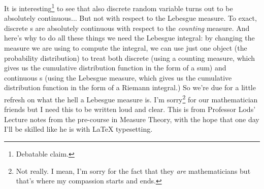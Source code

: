 \documentclass{report}
\begin{document}
It is interesting\footnote{Debatable claim.} to see that also discrete random variable turns out to be absolutely continuous... But not with respect to the Lebesgue measure. To exact, discrete \rv s are absolutely continuous with respect to the \textit{counting} measure. And here's why to do all these things we need the Lebesgue integral: by changing the measure we are using to compute the integral, we can use just one object (the probability distribution) to treat both discrete (using a counting measure, which gives us the cumulative distribution function in the form of a sum) and continuous \rv s (using the Lebesgue measure, which gives us the cumulative distribution function in the form of a Riemann integral.) 
So we're due for a little refresh on what the hell a Lebesgue measure is. I'm sorry\footnote{Not really. I mean, I'm sorry for the fact that they \textit{are} mathematicians but that's where my compassion starts and ends.} for our mathematician friends but I need this to be written loud and clear. This is from Professor Lods' Lecture notes from the pre-course in Measure Theory, with the hope that one day I'll be skilled like he is with \LaTeX{} typesetting.
\end{document}
